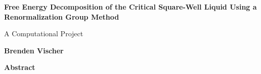 \thispagestyle{plain}
\begin{center}
    \Large
    \textbf{Free Energy Decomposition of the Critical Square-Well Liquid Using a Renormalization Group Method}
   
    \vspace{0.8cm}
    \large
    A Computational Project
    
    \vspace{0.8cm}
    \textbf{Brenden Vischer}
    
    \vspace{1.2cm}
    \textbf{Abstract}
\end{center}

\clearpage